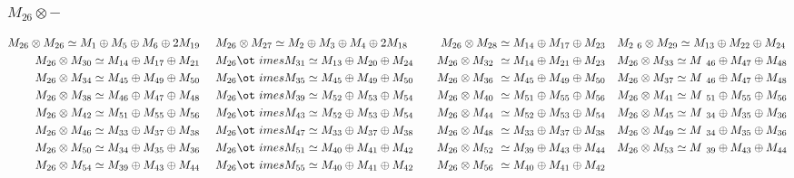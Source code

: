 \subsubsection{$M_26\otimes -$}
\begin{align*}
M_{26} \otimes M_{26} \simeq M_{1} \oplus M_{5} \oplus M_{6} \oplus 2 M_{19} &\
&& M_{26} \otimes M_{27} \simeq M_{2} \oplus M_{3} \oplus M_{4} \oplus 2 M_{18\
} &&& M_{26} \otimes M_{28} \simeq M_{14} \oplus M_{17} \oplus M_{23} &&& M_{2\
6} \otimes M_{29} \simeq M_{13} \oplus M_{22} \oplus M_{24}\\
M_{26} \otimes M_{30} \simeq M_{14} \oplus M_{17} \oplus M_{21} &&& M_{26} \ot\
imes M_{31} \simeq M_{13} \oplus M_{20} \oplus M_{24} &&& M_{26} \otimes M_{32\
} \simeq M_{14} \oplus M_{21} \oplus M_{23} &&& M_{26} \otimes M_{33} \simeq M\
_{46} \oplus M_{47} \oplus M_{48}\\
M_{26} \otimes M_{34} \simeq M_{45} \oplus M_{49} \oplus M_{50} &&& M_{26} \ot\
imes M_{35} \simeq M_{45} \oplus M_{49} \oplus M_{50} &&& M_{26} \otimes M_{36\
} \simeq M_{45} \oplus M_{49} \oplus M_{50} &&& M_{26} \otimes M_{37} \simeq M\
_{46} \oplus M_{47} \oplus M_{48}\\
M_{26} \otimes M_{38} \simeq M_{46} \oplus M_{47} \oplus M_{48} &&& M_{26} \ot\
imes M_{39} \simeq M_{52} \oplus M_{53} \oplus M_{54} &&& M_{26} \otimes M_{40\
} \simeq M_{51} \oplus M_{55} \oplus M_{56} &&& M_{26} \otimes M_{41} \simeq M\
_{51} \oplus M_{55} \oplus M_{56}\\
M_{26} \otimes M_{42} \simeq M_{51} \oplus M_{55} \oplus M_{56} &&& M_{26} \ot\
imes M_{43} \simeq M_{52} \oplus M_{53} \oplus M_{54} &&& M_{26} \otimes M_{44\
} \simeq M_{52} \oplus M_{53} \oplus M_{54} &&& M_{26} \otimes M_{45} \simeq M\
_{34} \oplus M_{35} \oplus M_{36}\\
M_{26} \otimes M_{46} \simeq M_{33} \oplus M_{37} \oplus M_{38} &&& M_{26} \ot\
imes M_{47} \simeq M_{33} \oplus M_{37} \oplus M_{38} &&& M_{26} \otimes M_{48\
} \simeq M_{33} \oplus M_{37} \oplus M_{38} &&& M_{26} \otimes M_{49} \simeq M\
_{34} \oplus M_{35} \oplus M_{36}\\
M_{26} \otimes M_{50} \simeq M_{34} \oplus M_{35} \oplus M_{36} &&& M_{26} \ot\
imes M_{51} \simeq M_{40} \oplus M_{41} \oplus M_{42} &&& M_{26} \otimes M_{52\
} \simeq M_{39} \oplus M_{43} \oplus M_{44} &&& M_{26} \otimes M_{53} \simeq M\
_{39} \oplus M_{43} \oplus M_{44}\\
M_{26} \otimes M_{54} \simeq M_{39} \oplus M_{43} \oplus M_{44} &&& M_{26} \ot\
imes M_{55} \simeq M_{40} \oplus M_{41} \oplus M_{42} &&& M_{26} \otimes M_{56\
} \simeq M_{40} \oplus M_{41} \oplus M_{42}\\
\end{align*}

